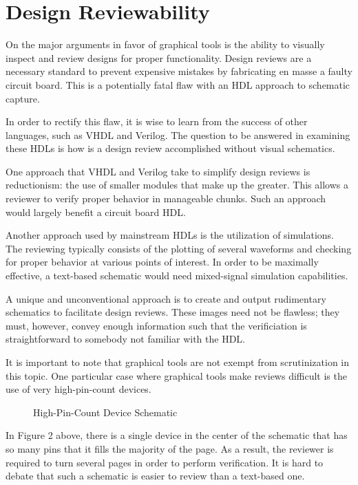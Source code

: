 \documentclass[10pt, draft, conference, letterpaper, twocolumn]{IEEEtran}
\begin{document}
\section{Design Reviewability}
	On the major arguments in favor of graphical tools is the ability to visually
	inspect and review designs for proper functionality.  Design reviews are a
	necessary standard to prevent expensive mistakes by fabricating en masse a
	faulty circuit board. This is a potentially fatal flaw with an HDL approach to
	schematic capture.
	
	In order to rectify this flaw, it is wise to learn from the success of other
	languages, such as VHDL and Verilog. The question to be answered in examining
	these HDLs is how is a design review accomplished without visual schematics.
	
	One approach that VHDL and Verilog take to simplify design reviews is
	reductionism: the use of smaller modules that make up the greater. This allows
	a reviewer to verify proper behavior in manageable chunks. Such an approach
	would largely benefit a circuit board HDL.
	
	Another approach used by mainstream HDLs is the utilization of simulations.
	The reviewing typically consists of the plotting of several waveforms and
	checking for proper behavior at various points of interest.  In order to be
	maximally effective, a text-based schematic would need mixed-signal simulation
	capabilities.
	
	A unique and unconventional approach is to create and output rudimentary
	schematics to facilitate design reviews. These images need not be flawless;
	they must, however, convey enough information such that the verificiation is
	straightforward to somebody not familiar with the HDL.
	
	It is important to note that graphical tools are not exempt from scrutinization
	in this topic. One particular case where graphical tools make reviews difficult
	is the use of very high-pin-count devices.

	\begin{figure}[h!]
		\centering
		\caption{High-Pin-Count Device Schematic}
	\end{figure}
	In Figure 2 above, there is a single device in the center of the schematic that
	has so many pins that it fills the majority of the page.  As a result, the
	reviewer is required to turn several pages in order to perform verification. It
	is hard to debate that such a schematic is easier to review than a text-based
	one.
	
\end{document}
